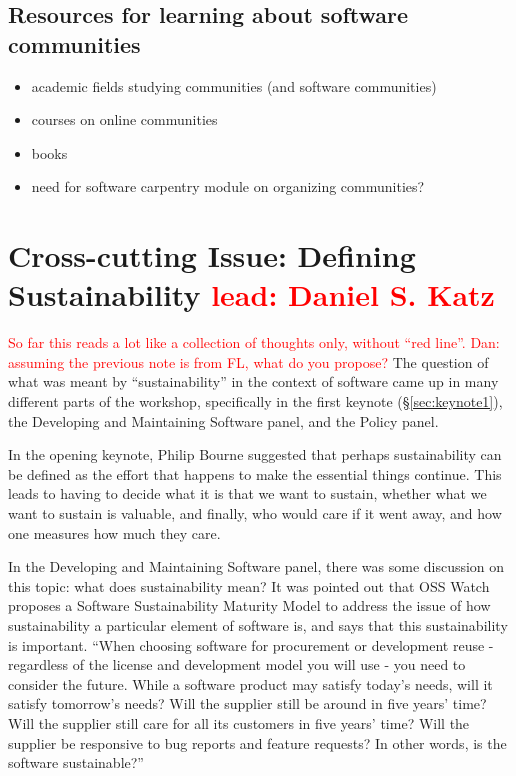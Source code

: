 \documentclass[11pt, oneside]{amsart}
\newcommand{\todo}[1]{{\color{blue}$\blacksquare$~\textsf{[TODO: #1]}}}
\newcommand{\note}[1]{ {\textcolor{red}    { #1 }}}
\begin{document}
\subsection{Resources for learning about software communities}
\begin{itemize}
\item academic fields studying communities (and software communities)
\item courses on online communities
\item books
\item need for software carpentry module on organizing communities?
\end{itemize}

%
%
%


\section{Cross-cutting Issue: Defining Sustainability \note{lead: Daniel S. Katz}}  \label{sec:cross-cutting}

\note{So far this reads a lot like a collection of thoughts only, without ``red line''.}
\note{Dan: assuming the previous note is from FL, what do you propose?}
The question of what was meant by ``sustainability'' in the context of software
came up in many different parts of the workshop, specifically in the first
keynote (\S\ref{sec:keynote1}), the Developing and Maintaining Software panel,
and the Policy panel.

In the opening keynote, Philip Bourne suggested that perhaps sustainability can
be defined as the effort that happens to make the essential things continue.
This leads to having to decide what it is that we want to sustain, whether what
we want to sustain is valuable, and finally, who would care if it went away,
and how one measures how much they care.

In the Developing and Maintaining Software panel, there was some discussion on
this topic: what does sustainability mean? It was pointed out that OSS Watch
proposes a Software Sustainability Maturity Model to address the issue of how
sustainability a particular element of software is, and says that this
sustainability is important. ``When choosing software for procurement or
development reuse - regardless of the license and development model you will
use - you need to consider the future. While a software product may satisfy
today's needs, will it satisfy tomorrow's needs? Will the supplier still be
around in five years' time? Will the supplier still care for all its customers
in five years' time? Will the supplier be responsive to bug reports and feature
requests? In other words, is the software sustainable?''~\cite{OSS-ssmm-web}
\end{document}
